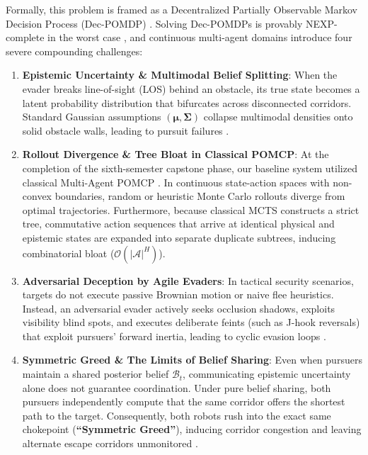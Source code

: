 \documentclass[conference]{IEEEtran}
\begin{document}
Formally, this problem is framed as a Decentralized Partially Observable Markov Decision Process (Dec-POMDP) \cite{bernstein2002complexity}. Solving Dec-POMDPs is provably NEXP-complete in the worst case \cite{bernstein2002complexity}, and continuous multi-agent domains introduce four severe compounding challenges:
\begin{enumerate}
    \item \textbf{Epistemic Uncertainty \& Multimodal Belief Splitting}: When the evader breaks line-of-sight (LOS) behind an obstacle, its true state becomes a latent probability distribution that bifurcates across disconnected corridors. Standard Gaussian assumptions $(\boldsymbol{\mu}, \boldsymbol{\Sigma})$ collapse multimodal densities onto solid obstacle walls, leading to pursuit failures \cite{silver2010monte}.
    \item \textbf{Rollout Divergence \& Tree Bloat in Classical POMCP}: At the completion of the sixth-semester capstone phase, our baseline system utilized classical Multi-Agent POMCP \cite{silver2010monte}. In continuous state-action spaces with non-convex boundaries, random or heuristic Monte Carlo rollouts diverge from optimal trajectories. Furthermore, because classical MCTS constructs a strict tree, commutative action sequences that arrive at identical physical and epistemic states are expanded into separate duplicate subtrees, inducing combinatorial bloat ($\mathcal{O}(|\mathcal{A}|^H)$).
    \item \textbf{Adversarial Deception by Agile Evaders}: In tactical security scenarios, targets do not execute passive Brownian motion or naive flee heuristics. Instead, an adversarial evader actively seeks occlusion shadows, exploits visibility blind spots, and executes deliberate feints (such as J-hook reversals) that exploit pursuers' forward inertia, leading to cyclic evasion loops \cite{aleksandrov2021pursuit}.
    \item \textbf{Symmetric Greed \& The Limits of Belief Sharing}: Even when pursuers maintain a shared posterior belief $\mathcal{B}_t$, communicating epistemic uncertainty alone does not guarantee coordination. Under pure belief sharing, both pursuers independently compute that the same corridor offers the shortest path to the target. Consequently, both robots rush into the exact same chokepoint (\textbf{``Symmetric Greed''}), inducing corridor congestion and leaving alternate escape corridors unmonitored \cite{macalpine2018customized}.
\end{enumerate}
\end{document}
